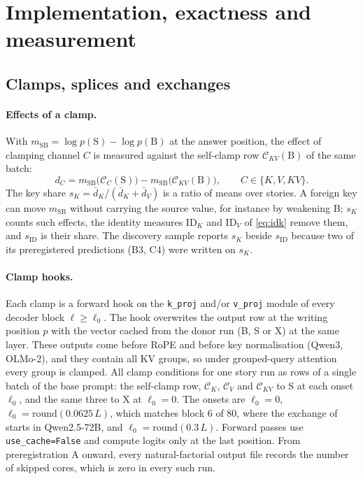 \section{Implementation, exactness and measurement}\label{app:impl}

\subsection{Clamps, splices and exchanges}\label{app:impl-clamps}

\paragraph{Effects of a clamp.} With $m_{\mathrm{SB}} = \log p(\mathrm{S}) - \log p(\mathrm{B})$ at the answer position, the effect of clamping channel $C$ is measured against the self-clamp row $\mathcal{C}_{KV}(\mathrm{B})$ of the same batch:
\begin{equation}\label{eq:dc}
d_C = m_{\mathrm{SB}}\big(\mathcal{C}_C(\mathrm{S})\big) - m_{\mathrm{SB}}\big(\mathcal{C}_{KV}(\mathrm{B})\big), \qquad C \in \{K, V, KV\}.
\end{equation}
The key share $s_K = \bar d_K / (\bar d_K + \bar d_V)$ is a ratio of means over stories. A foreign key can move $m_{\mathrm{SB}}$ without carrying the source value, for instance by weakening B; $s_K$ counts such effects, the identity measures $\mathrm{ID}_K$ and $\mathrm{ID}_V$ of \cref{eq:idk} remove them, and $s_{\mathrm{ID}}$ is their share. The discovery sample reports $s_K$ beside $s_{\mathrm{ID}}$ because two of its preregistered predictions (B3, C4) were written on $s_K$.

\paragraph{Clamp hooks.} Each clamp is a forward hook on the \texttt{k\_proj} and/or \texttt{v\_proj} module of every decoder block $\ell \geq \ell_0$. The hook overwrites the output row at the writing position $p$ with the vector cached from the donor run (B, S or X) at the same layer. These outputs come before RoPE and before key normalisation (Qwen3, OLMo-2), and they contain all KV groups, so under grouped-query attention every group is clamped. All clamp conditions for one story run as rows of a single batch of the base prompt: the self-clamp row, $\mathcal{C}_K$, $\mathcal{C}_V$ and $\mathcal{C}_{KV}$ to S at each onset $\ell_0$, and the same three to X at $\ell_0 = 0$. The onsets are $\ell_0 = 0$, $\ell_0 = \mathrm{round}(0.0625\,L)$, which matches block 6 of 80, where the exchange of \citet{anonymous2026fitted} starts in Qwen2.5-72B, and $\ell_0 = \mathrm{round}(0.3\,L)$. Forward passes use \texttt{use\_cache=False} and compute logits only at the last position. From preregistration A onward, every natural-factorial output file records the number of skipped cores, which is zero in every such run.

